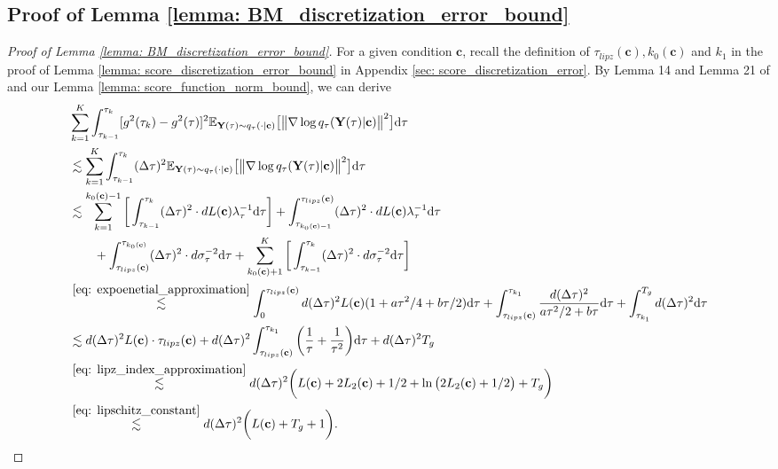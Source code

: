 \documentclass[11pt]{article}
\newcommand{\mE}{\mathbb{E}}
\newcommand{\bY}{\mathbf{Y}}
\newcommand{\bc}{\mathbf{c}}
\newcommand{\intd}{\mathrm{d}}
\begin{document}
\subsection{Proof of Lemma \ref{lemma: BM_discretization_error_bound}}\label{sec: BM_discrete_error}


\begin{proof}[Proof of Lemma \ref{lemma: BM_discretization_error_bound}]
    For a given condition $\bc$, recall the definition of $\tau_{lipz}(\bc), k_0(\bc)$ and $k_1$ in the proof of Lemma \ref{lemma: score_discretization_error_bound} in Appendix \ref{sec: score_discretization_error}. By Lemma 14 and Lemma 21 of \cite{chen2023improved} and our Lemma \ref{lemma: score_function_norm_bound}, we can derive
\begin{align*}
    &\sum_{k=1}^{K}\int_{\tau_{k - 1}}^{\tau_{k}}[g^2(\tau_k) - g^2(\tau)]^2\mE_{\bY(\tau)\sim q_{\tau}(\cdot | \bc)} \big[\big\|\nabla\log q_\tau(\bY(\tau) | \bc)\big\|^2\big] \intd\tau\\
    &\lesssim \sum_{k=1}^{K}\int_{\tau_{k - 1}}^{\tau_{k}}(\Delta\tau)^2\mE_{\bY(\tau)\sim q_{\tau}(\cdot | \bc)} \big[\big\|\nabla\log q_\tau(\bY(\tau) | \bc)\big\|^2\big] \intd\tau\\
    &\lesssim \sum_{k=1}^{k_0(\bc) - 1} \bigg[\int_{\tau_{k - 1}}^{\tau_{k}}(\Delta\tau)^2\cdot dL(\bc)\lambda_\tau^{-1} \intd\tau \bigg] + \int_{\tau_{k_0(\bc) - 1}}^{\tau_{lipz}(\bc)}(\Delta\tau)^2\cdot dL(\bc)\lambda_\tau^{-1} \intd\tau \\
    &\qquad + \int_{\tau_{lipz}(\bc)}^{\tau_{k_0(\bc)}}(\Delta\tau)^2\cdot d\sigma^{-2}_\tau \intd\tau + \sum_{k_0(\bc) + 1}^K\bigg[\int_{\tau_{k - 1}}^{\tau_{k}}(\Delta\tau)^2\cdot d\sigma^{-2}_\tau \intd\tau\bigg]\\
    &\overset{\eqref{eq: expoenetial_approximation} }{\lesssim} \int_{0}^{\tau_{lipz}(\bc)} d(\Delta\tau)^2L(\bc)(1 + a\tau^2/4 + b\tau/2) \intd\tau + \int_{\tau_{lipz}(\bc)}^{\tau_{k_1}} \frac{d(\Delta\tau)^2}{a\tau^2/2 + b\tau} \intd\tau + \int_{\tau_{k_1}}^{T_g} d(\Delta\tau)^2 \intd\tau\\
    &\lesssim d(\Delta\tau)^2L(\bc)\cdot \tau_{lipz}(\bc) + d(\Delta\tau)^2\int_{\tau_{lipz}(\bc)}^{\tau_{k_1}}\bigg(\frac{1}{\tau} + \frac{1}{\tau^2} \bigg)\intd\tau + d(\Delta\tau)^2T_g\\
    &\overset{\eqref{eq: lipz_index_approximation}}{\lesssim} d(\Delta\tau)^2\bigg(L(\bc) + 2L_2(\bc) + 1/2 + \ln\big(2L_2(\bc) + 1/2\big) + T_g \bigg)\\
    &\overset{\eqref{eq: lipschitz_constant}}{\lesssim} d(\Delta\tau)^2\bigg(L(\bc) + T_g + 1 \bigg).

\end{align*}
\end{proof}
\end{document}
